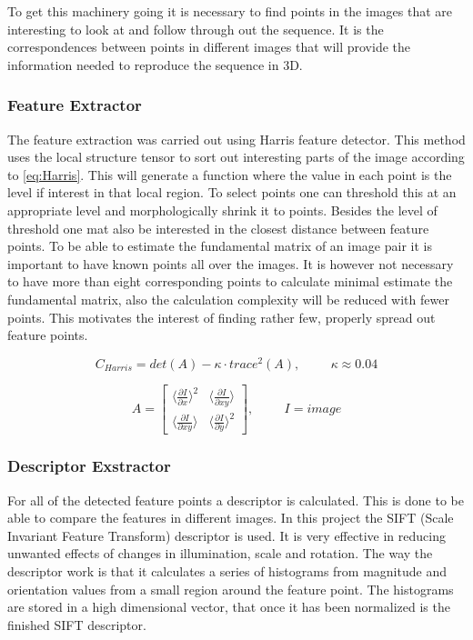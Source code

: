 To get this machinery going it is necessary to find points in the images that are interesting to look at and follow through out the sequence. It is the correspondences between points in different images that will provide the information needed to reproduce the sequence in 3D. 

\subsubsection{Feature Extractor}
The feature extraction was carried out using Harris feature detector. This method uses the local structure tensor to sort out interesting parts of the image according to \eqref{eq:Harris}. This will generate a function where the value in each point is the level if interest in that local region. To select points one can threshold this at an appropriate level and morphologically shrink it to points. Besides the level of threshold one mat also be interested in the closest distance between feature points. To be able to estimate the fundamental matrix of an image pair it is important to have known points all over the images. It is however not necessary to have more than eight corresponding points to calculate minimal estimate the fundamental matrix, also the calculation complexity will be reduced with fewer points. This motivates the interest of finding rather few, properly spread out feature points. 

\begin{equation}
\label{eq:Harris}
C_{Harris} = det(A) - \kappa \cdot trace^2(A), \hspace{1cm} \kappa \approx 0.04
\end{equation} 

\begin{equation}
\label{eq:StructureTensor}
A =  \begin{bmatrix}
	   \langle \frac{\partial I}{\partial x} \rangle^2 &  \langle \frac{\partial I}{\partial x y} \rangle \\
	   \langle \frac{\partial I}{\partial x y} \rangle & \langle \frac{\partial I}{\partial y} \rangle^2
	  \end{bmatrix}
	  , \hspace{1cm} I = image
\end{equation}

\subsubsection{Descriptor Exstractor}
For all of the detected feature points a descriptor is calculated. This is done to be able to compare the features in different images. In this project the SIFT (Scale Invariant Feature Transform) descriptor is used. It is very effective in reducing unwanted effects of changes in illumination, scale and rotation. The way the descriptor work is that it calculates a series of histograms from magnitude and orientation values from a small region around the feature point. The histograms are stored in a high dimensional vector, that once it has been normalized is the finished SIFT descriptor.

